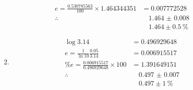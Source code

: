 \documentclass{article}
\begin{document}
\begin{enumerate}[start=14]
\begin{enumerate}
\begin{align*}
				e = \frac{\num{0.530785563}}{100} \times \num{1.464344351} &=
				\num{0.007772528} \\
				\therefore &\quad \boxed{\num{1.464(8)}} \\
				&\quad \boxed{1.464 \pm \SI{0.5}{\percent}}
			\end{align*}
		\item \begin{align*}
				\log 3.14 &= \num{0.496929648} \\
				e = \frac{1}{\ln 10} \frac{0.05}{3.14} &= \num{0.006915517} \\
				\%e = \frac{\num{0.006915517}}{\num{0.496929648}} \times 100 &=
				\num{1.391649151} \\
				\therefore &\quad \boxed{\num{0.497(7)}} \\
				&\quad \boxed{0.497 \pm \SI{1}{\percent}}
			\end{align*}
		\end{enumerate}
\end{enumerate}
\end{document}
